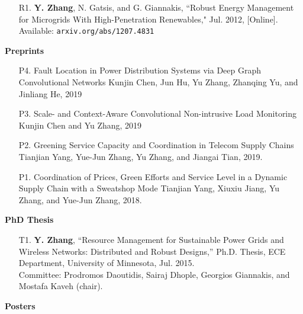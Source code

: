 \documentclass[margin,line]{res}
\begin{document}
\begin{resume}
\begin{enumerate}
\item[R1.]	\textbf{Y. Zhang}, N. Gatsis, and G. Giannakis,
``Robust Energy Management for Microgrids With High-Penetration Renewables,"
 Jul. 2012, [Online]. Available: \texttt{arxiv.org/abs/1207.4831}

\end{enumerate}

\vspace{.2cm}


{\bf Preprints}

\begin{enumerate}

\item[P4.]  Fault Location in Power Distribution Systems via Deep Graph Convolutional Networks
Kunjin Chen, Jun Hu, Yu Zhang, Zhanqing Yu, and Jinliang He, 2019

\item[P3.] Scale- and Context-Aware Convolutional Non-intrusive Load Monitoring
Kunjin Chen and Yu Zhang, 2019


\item[P2.] Greening Service Capacity and Coordination in Telecom Supply Chains
Tianjian Yang, Yue-Jun Zhang, Yu Zhang, and Jiangai Tian, 2019.

\item[P1.]  Coordination of Prices, Green Efforts and Service Level in a Dynamic Supply Chain with a Sweatshop Mode
Tianjian Yang, Xiuxiu Jiang, Yu Zhang, and Yue-Jun Zhang, 2018.

\end{enumerate}

{\bf PhD Thesis}

\vspace{.2cm}

\begin{enumerate}


\item[T1.] \textbf{Y. Zhang}, ``Resource Management for Sustainable Power Grids and Wireless Networks: Distributed and Robust Designs,'' Ph.D. Thesis, ECE Department, University of Minnesota, Jul. 2015.\\
    Committee: Prodromos Daoutidis, Sairaj Dhople, Georgios Giannakis, and Mostafa Kaveh (chair).

\end{enumerate}

\vspace{.2cm}


{\bf Posters}

\vspace{.2cm}


\end{resume}
\end{document}
